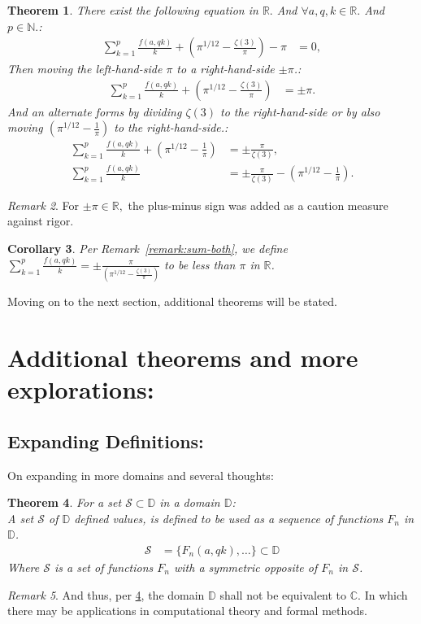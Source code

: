 \documentclass[10pt]{article}
\theoremstyle{plain}
\newtheorem{theorem}{Theorem}[section]
\newtheorem{corollary}[theorem]{Corollary}
\theoremstyle{definition}
\theoremstyle{remark}
\newtheorem{remark}[theorem]{Remark}
\begin{document}
\begin{theorem}
There exist the following equation in $\mathbb{R}.$ And $\forall a, q, k \in \mathbb{R}.$ And $p \in \mathbb{N}.$:
\begin{align*}
	\sum_{k=1}^{p} \frac{f(a, qk)}{k} + (\pi^{1/12} - \frac{\zeta(3)}{\pi}) - \pi &= 0,
\end{align*}
Then moving the left-hand-side $\pi$ to a right-hand-side $\pm \pi$.:
\begin{align*}
	\sum_{k=1}^{p} \frac{f(a, qk)}{k} + (\pi^{1/12} - \frac{\zeta(3)}{\pi}) &= \pm \pi.
\end{align*}
And an alternate forms by dividing $\zeta(3)$ to the right-hand-side or by also moving $(\pi^{1/12} - \frac{1}{\pi})$ to the right-hand-side.:
\begin{align*}
	\sum_{k=1}^{p} \frac{f(a, qk)}{k} + (\pi^{1/12} - \frac{1}{\pi}) &= \pm \frac{\pi}{\zeta(3)},\\
	\sum_{k=1}^{p} \frac{f(a, qk)}{k} &= \pm \frac{\pi}{\zeta(3)} - (\pi^{1/12} - \frac{1}{\pi}) .
\end{align*}
\end{theorem}
\begin{remark}
For $\pm \pi \in \mathbb{R},$ the plus-minus sign was added as a caution measure against rigor.
\end{remark}
\begin{corollary}
Per Remark~\ref{remark:sum-both}, we define $\sum_{k=1}^{p} \frac{f(a, qk)}{k} = \pm \frac{\pi}{(\pi^{1/12} - \frac{\zeta(3)}{\pi})}$ to be less than $\pi$ in $\mathbb{R}$.
\end{corollary} Moving on to the next section, additional theorems will be stated.

\section{Additional theorems and more explorations:}

\subsection{Expanding Definitions:}
On expanding in more domains and several thoughts:

\begin{theorem}
\label{theo-1}
	For a set $\mathcal{S} \subset \mathbb{D}$ in a domain $\mathbb{D}$:\\
	A set $\mathcal{S}$ of $\mathbb{D}$ defined values, is defined to be used as a sequence of functions $F_n$ in $\mathbb{D}$.
	\begin{align*}
		\mathcal{S} &= \{F_n(a, qk), \dots\} \subset \mathbb{D}
	\end{align*}
	Where $\mathcal{S}$ is a set of functions $F_n$ with a symmetric opposite of $F_n$ in $\mathcal{S}$.
\end{theorem}
\begin{remark}
	And thus, per \ref{theo-1}, the domain $\mathbb{D}$ shall not be equivalent to $\mathbb{C}$. In which there may be applications in computational theory and formal methods.
\end{remark}
\end{document}
